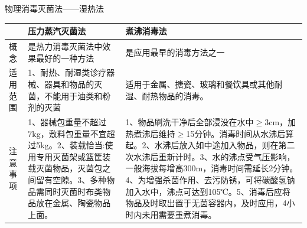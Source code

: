 \documentclass[11pt, a4paper]{ctexart}
\begin{document}
\begin{tipsbox}{物理消毒灭菌法——湿热法}
	\begin{tabular}{|p{3cm}|p{5cm}|p{5cm}|}
		\hline
		     & \textbf{压力蒸汽灭菌法}                                                                          & \textbf{煮沸消毒法}                                                                                                                                                                                    \\
		\hline
		概念   & 是热力消毒灭菌法中效果最好的一种方法                                                                        & 是应用最早的消毒方法之一                                                                                                                                                                                      \\
		\hline
		适用范围 & 1、耐热、耐湿类诊疗器械、器具和物品的灭菌，不能用于油类和粉剂的灭菌                                                        & 适用于金属、搪瓷、玻璃和餐饮具或其他耐湿、耐热物品的消毒。                                                                                                                                                                     \\
		\hline
		注意事项 & 1、器械包重量不超过7kg，敷料包重量不宜超过5kg。2、装载恰当:使用专用灭菌架或篮筐装载灭菌物品，灭菌包之间留有空隙。3、多种物品需同时灭菌时布类物品放在金属、陶瓷物品上面。 & 1、物品刷洗干净后全部浸没在水中$\geq$3cm，加热煮沸后维持$\geq$15分钟。消毒时间从水沸后算起。2、水沸后放入如中途加入物品，则在第二次水沸后重新计时。3、水的沸点受气压影响，一般海拔每增高300m，消毒时间需延长2分钟。4、为增强杀菌作用、去污防锈，可将碳酸氢钠加入水中，沸点可达到105℃。5、消毒后应将物品及时取出置于无菌容器内，及时应用，4小时内未用需要重煮消毒。 \\
		\hline
	\end{tabular}
\end{tipsbox}
\end{document}
